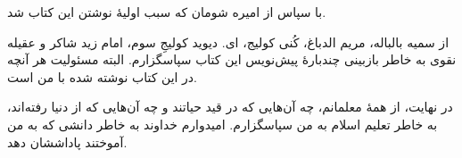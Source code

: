 با سپاس از امیره شومان که سبب اولیهٔ نوشتن این کتاب شد. 

از سمیه بالباله، مریم الدباغ، کُنی کولیج، ای. دیوید کولیجِ سوم، امام زید شاکر و عقیله نقوی به خاطر بازبینی چندبارهٔ پیش‌نویس این کتاب سپاسگزارم. البته مسئولیت هر آنچه در این کتاب نوشته شده با من است. 

در نهایت، از همهٔ معلمانم، چه آن‌هایی که در قید حیاتند و چه آن‌هایی که از دنیا رفته‌اند، به خاطر تعلیم اسلام به من سپاسگزارم.  امیدوارم خداوند به خاطر دانشی که به من آموختند پاداششان دهد.



